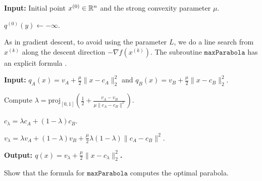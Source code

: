 \begin{algorithm2e}[H]

\caption{$\mathtt{ParabolaMethod}$}

\SetAlgoLined

\textbf{Input:} Initial point $x^{(0)}\in\mathbb{R}^{n}$ and the strong convexity
parameter $\mu$.

$q^{(0)}(y)\leftarrow-\infty$.


\end{algorithm2e}

As in gradient descent, to avoid using the parameter $L$, we do a
line search from $x^{(k)}$ along the descent direction $-\nabla f(x^{(k)})$.
 The subroutine $\mathtt{maxParabola}$ has an explicit formula \cite{drusvyatskiy2016optimal}.

\begin{algorithm2e}[H]

\caption{$q=\mathtt{maxParabola}(\max(q_{a},q_{b}))$}

\SetAlgoLined

\textbf{Input:} $q_{A}(x)=v_{A}+\frac{\mu}{2}\|x-c_{A}\|^{2}_{2}$
and $q_{B}(x)=v_{B}+\frac{\mu}{2}\|x-c_{B}\|^{2}_{2}$.

Compute $\lambda=\mathrm{proj}_{[0,1]}\left(\frac{1}{2}+\frac{v_{A}-v_{B}}{\mu\|c_{A}-c_{B}\|^{2}}\right)$.

$c_{\lambda}=\lambda c_{A}+(1-\lambda)c_{B}$.

$v_{\lambda}=\lambda v_{A}+(1-\lambda)v_{B}+\frac{\mu}{2}\lambda(1-\lambda)\|c_{A}-c_{B}\|^{2}$.

\textbf{Output: $q(x)=v_{\lambda}+\frac{\mu}{2}\|x-c_{\lambda}\|^{2}_{2}$.}

\end{algorithm2e}
\begin{xca}
Show that the formula for $\mathtt{maxParabola}$ computes the optimal
parabola.
\end{xca}


